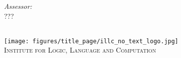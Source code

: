 \documentclass{report}
\newcommand{\red}[1]{{\color{red}{#1}}}
\begin{document}
{\begin{titlepage}
\begin{minipage}[t]{0.4\textwidth}
\begin{flushright} \large

\emph{Assessor:} \\

???


\end{flushright}

\end{minipage}\\[2cm]









\texttt{[image: figures/title\_page/illc\_no\_text\_logo.jpg]}\\ %

\textsc{\large Institute for Logic, Language and Computation}\\[1.0cm] %

 




\vfill %



\end{titlepage}
\clearpage
\restoregeometry
}


\doublespacing
\tableofcontents

\listoffootnotes

% 
\end{document}
